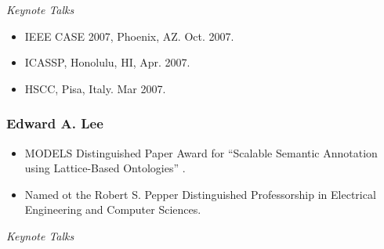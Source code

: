\emph{Keynote Talks}

\begin{itemize}
\item IEEE CASE 2007, Phoenix, AZ. Oct. 2007.
\item ICASSP, Honolulu, HI, Apr. 2007.
\item HSCC, Pisa, Italy. Mar 2007.
\end{itemize}

\subsubsection{Edward A. Lee}

\begin{itemize}
\item MODELS Distinguished Paper Award for ``Scalable Semantic Annotation using Lattice-Based Ontologies'' \cite{LeungMandlLatronicoSheltonLee09_ScalableSemanticAnnotationUsingLatticebasedOntologies}.
\item Named ot the Robert S. Pepper Distinguished Professorship in Electrical Engineering and Computer Sciences.

\end{itemize}
                 \emph{Keynote Talks}

